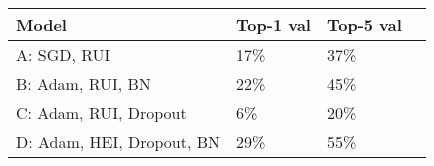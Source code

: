 

\begin{table}[htbp]
\begin{center}
\begin{tabular}{|l|l|l|l|}
\hline
\textbf{Model} & \textbf{Top-1 val} & \textbf{Top-5 val}  \\
\hline
          A: SGD, RUI                &   17\%  		  &  37\% \\
          B: Adam, RUI, BN           &   22\%  		  &  45\% \\
          C: Adam, RUI, Dropout      &   6\%      	&  20\% \\
          D: Adam, HEI, Dropout, BN  &   29\%  	    &  55\% \\

\hline
\end{tabular}
\label{table:accuracy}
\end{center}
\end{table}

